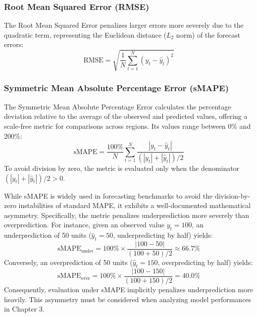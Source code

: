 \subsubsection{Root Mean Squared Error (RMSE)}
The Root Mean Squared Error penalizes larger errors more severely due to the quadratic term, representing the Euclidean distance ($L_2$ norm) of the forecast errors:
\begin{equation}
\text{RMSE} = \sqrt{\frac{1}{N}\sum_{t=1}^N (y_t - \hat{y}_t)^2}
\end{equation}

\subsubsection{Symmetric Mean Absolute Percentage Error (sMAPE)}
The Symmetric Mean Absolute Percentage Error calculates the percentage deviation relative to the average of the observed and predicted values, offering a scale-free metric for comparisons across regions. Its values range between 0\% and 200\%:
\begin{equation}
\text{sMAPE} = \frac{100\%}{N}\sum_{t=1}^N \frac{|y_t - \hat{y}_t|}{(|y_t| + |\hat{y}_t|)/2}
\end{equation}
To avoid division by zero, the metric is evaluated only when the denominator $(|y_t| + |\hat{y}_t|)/2 > 0$.

While sMAPE is widely used in forecasting benchmarks to avoid the division-by-zero instabilities of standard MAPE, it exhibits a well-documented mathematical asymmetry. Specifically, the metric penalizes underprediction more severely than overprediction. For instance, given an observed value $y_t = 100$, an underprediction of 50 units ($\hat{y}_t = 50$, underpredicting by half) yields:
\begin{equation}
\text{sMAPE}_{\text{under}} = 100\% \times \frac{|100 - 50|}{(100 + 50)/2} \approx 66.7\%
\end{equation}
Conversely, an overprediction of 50 units ($\hat{y}_t = 150$, overpredicting by half) yields:
\begin{equation}
\text{sMAPE}_{\text{over}} = 100\% \times \frac{|100 - 150|}{(100 + 150)/2} = 40.0\%
\end{equation}
Consequently, evaluation under sMAPE implicitly penalizes underprediction more heavily. This asymmetry must be considered when analyzing model performances in Chapter 3.

